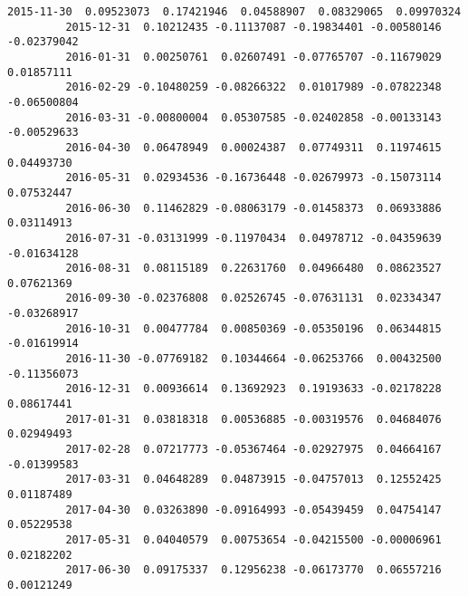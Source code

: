 \documentclass[11pt]{article}
\begin{document}
\begin{Verbatim}[commandchars=\\\{\}]
         2015-11-30  0.09523073  0.17421946  0.04588907  0.08329065  0.09970324   
         2015-12-31  0.10212435 -0.11137087 -0.19834401 -0.00580146 -0.02379042   
         2016-01-31  0.00250761  0.02607491 -0.07765707 -0.11679029  0.01857111   
         2016-02-29 -0.10480259 -0.08266322  0.01017989 -0.07822348 -0.06500804   
         2016-03-31 -0.00800004  0.05307585 -0.02402858 -0.00133143 -0.00529633   
         2016-04-30  0.06478949  0.00024387  0.07749311  0.11974615  0.04493730   
         2016-05-31  0.02934536 -0.16736448 -0.02679973 -0.15073114  0.07532447   
         2016-06-30  0.11462829 -0.08063179 -0.01458373  0.06933886  0.03114913   
         2016-07-31 -0.03131999 -0.11970434  0.04978712 -0.04359639 -0.01634128   
         2016-08-31  0.08115189  0.22631760  0.04966480  0.08623527  0.07621369   
         2016-09-30 -0.02376808  0.02526745 -0.07631131  0.02334347 -0.03268917   
         2016-10-31  0.00477784  0.00850369 -0.05350196  0.06344815 -0.01619914   
         2016-11-30 -0.07769182  0.10344664 -0.06253766  0.00432500 -0.11356073   
         2016-12-31  0.00936614  0.13692923  0.19193633 -0.02178228  0.08617441   
         2017-01-31  0.03818318  0.00536885 -0.00319576  0.04684076  0.02949493   
         2017-02-28  0.07217773 -0.05367464 -0.02927975  0.04664167 -0.01399583   
         2017-03-31  0.04648289  0.04873915 -0.04757013  0.12552425  0.01187489   
         2017-04-30  0.03263890 -0.09164993 -0.05439459  0.04754147  0.05229538   
         2017-05-31  0.04040579  0.00753654 -0.04215500 -0.00006961  0.02182202   
         2017-06-30  0.09175337  0.12956238 -0.06173770  0.06557216  0.00121249   
         

\end{Verbatim}
\end{document}
